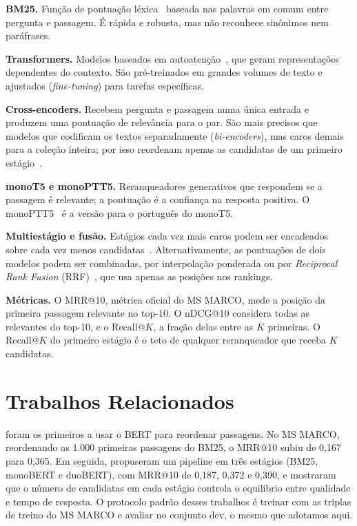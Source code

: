 \documentclass[12pt]{article}
\begin{document}
\textbf{BM25.} Função de pontuação léxica~\cite{robertson:2009} baseada nas palavras em comum
entre pergunta e passagem. É rápida e robusta, mas não reconhece sinônimos nem paráfrases.

\textbf{Transformers.} Modelos baseados em autoatenção~\cite{vaswani:2017}, que geram
representações dependentes do contexto. São pré-treinados em grandes volumes de texto e
ajustados (\textit{fine-tuning}) para tarefas específicas.

\textbf{Cross-encoders.} Recebem pergunta e passagem numa única entrada e produzem uma
pontuação de relevância para o par. São mais precisos que modelos que codificam os textos
separadamente (\textit{bi-encoders}), mas caros demais para a coleção inteira; por isso
reordenam apenas as candidatas de um primeiro estágio~\cite{nogueira:2019}.

\textbf{monoT5 e monoPTT5.} Reranqueadores generativos que respondem se a passagem é
relevante; a pontuação é a confiança na resposta positiva. O
monoPTT5~\cite{piau:2024} é a versão para o português do monoT5.

\textbf{Multiestágio e fusão.} Estágios cada vez mais caros podem ser encadeados sobre cada
vez menos candidatas~\cite{nogueira:2019multistage}. Alternativamente, as pontuações de dois
modelos podem ser combinadas, por interpolação ponderada ou por \textit{Reciprocal Rank
Fusion} (RRF)~\cite{cormack:2009}, que usa apenas as posições nos rankings.

\textbf{Métricas.} O MRR@10, métrica oficial do MS MARCO, mede a posição da primeira passagem
relevante no top-10. O nDCG@10 considera todas as relevantes do top-10, e o Recall@$K$, a
fração delas entre as $K$ primeiras. O Recall@$K$ do primeiro estágio é o teto de qualquer
reranqueador que receba $K$ candidatas.

\section{Trabalhos Relacionados}
\label{sec:relacionados}

\cite{nogueira:2019} foram os primeiros a usar o BERT para reordenar passagens. No MS MARCO,
reordenando as 1.000 primeiras passagens do BM25, o MRR@10 subiu de 0,167 para 0,365. Em
seguida, \cite{nogueira:2019multistage} propuseram um pipeline em três estágios (BM25,
monoBERT e duoBERT), com MRR@10 de 0,187, 0,372 e 0,390, e mostraram que o número de
candidatas em cada estágio controla o equilíbrio entre qualidade e tempo de resposta. O
protocolo padrão desses trabalhos é treinar com as triplas de treino do MS MARCO e avaliar
no conjunto dev, o mesmo que adotamos aqui.
\end{document}
